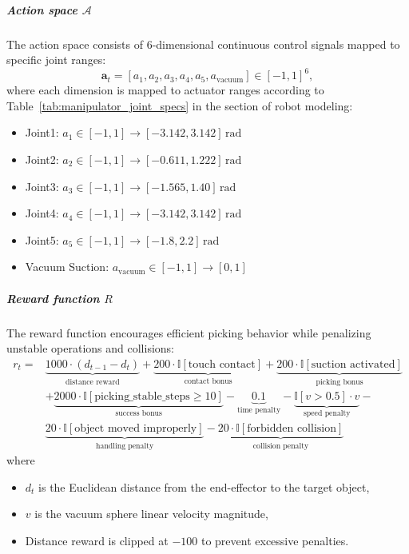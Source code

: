\documentclass[english, 12pt, a4paper, elec, utf8, a-2b, online]{aaltothesis}
\begin{document}
\subparagraph{Action space $\mathcal{A}$}
The action space consists of 6-dimensional continuous control signals mapped to specific joint ranges:
\begin{equation}
\mathbf{a}_t = [a_1, a_2, a_3, a_4, a_5, a_{\text{vacuum}}] \in [-1,1]^6,
\end{equation}
where each dimension is mapped to actuator ranges according to Table~\ref{tab:manipulator_joint_specs} in the section of robot modeling:
\begin{itemize}
    \item Joint1: $a_1 \in [-1,1] \rightarrow [-3.142, 3.142]\,\text{rad}$
    \item Joint2: $a_2 \in [-1,1] \rightarrow [-0.611, 1.222]\,\text{rad}$
    \item Joint3: $a_3 \in [-1,1] \rightarrow [-1.565, 1.40]\,\text{rad}$
    \item Joint4: $a_4 \in [-1,1] \rightarrow [-3.142, 3.142]\,\text{rad}$
    \item Joint5: $a_5 \in [-1,1] \rightarrow [-1.8, 2.2]\,\text{rad}$
    \item Vacuum Suction: $a_{\text{vacuum}} \in [-1,1] \rightarrow [0,1]$
\end{itemize}

\subparagraph{Reward function $R$}
The reward function encourages efficient picking behavior while penalizing unstable operations and collisions:
\begin{equation}
\begin{aligned}
r_t = & \underbrace{1000 \cdot (d_{t-1} - d_t)}_{\text{distance reward}} + 
       \underbrace{200 \cdot \mathbb{I}[\text{touch contact}]}_{\text{contact bonus}} +
       \underbrace{200 \cdot \mathbb{I}[\text{suction activated}]}_{\text{picking bonus}} \\
      & + \underbrace{2000 \cdot \mathbb{I}[\text{picking\_stable\_steps} \geq 10]}_{\text{success bonus}}
     - \underbrace{0.1}_{\text{time penalty}} - 
       \underbrace{\mathbb{I}[v > 0.5] \cdot v}_{\text{speed penalty}} - \\& 
       \underbrace{20 \cdot \mathbb{I}[\text{object moved improperly}]}_{\text{handling penalty}} 
       - \underbrace{20 \cdot \mathbb{I}[\text{forbidden collision}]}_{\text{collision penalty}}
\end{aligned}
\end{equation}
where
\begin{itemize}
    \item $d_t$ is the Euclidean distance from the end-effector to the target object,
    \item $v$ is the vacuum sphere linear velocity magnitude,
    \item Distance reward is clipped at $-100$ to prevent excessive penalties.
\end{itemize}
\end{document}
